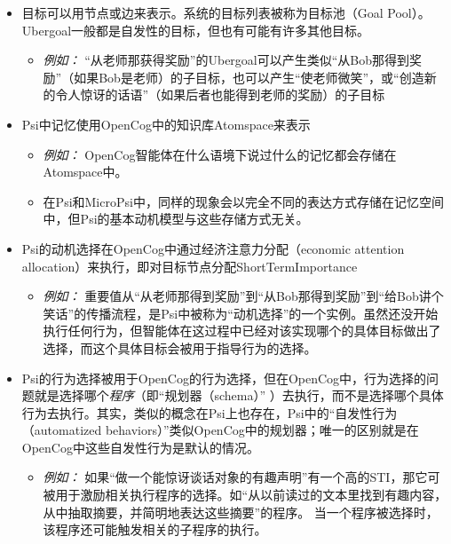 \begin{itemize}
\begin{itemize}
\end{itemize}

\item 目标可以用节点或边来表示。系统的目标列表被称为目标池（Goal Pool）。Ubergoal一般都是自发性的目标，但也有可能有许多其他目标。

\begin{itemize}
\item {\it 例如：} “从老师那获得奖励”的Ubergoal可以产生类似“从Bob那得到奖励”（如果Bob是老师）的子目标，也可以产生“使老师微笑”，或“创造新的令人惊讶的话语”（如果后者也能得到老师的奖励）的子目标
\end{itemize}

\item Psi中记忆使用OpenCog中的知识库Atomspace来表示
\begin{itemize}
\item {\it 例如：} OpenCog智能体在什么语境下说过什么的记忆都会存储在Atomspace中。

\item 在Psi和MicroPsi中，同样的现象会以完全不同的表达方式存储在记忆空间中，但Psi的基本动机模型与这些存储方式无关。

\end{itemize}

\item Psi的动机选择在OpenCog中通过经济注意力分配（economic attention allocation）来执行，即对目标节点分配ShortTermImportance  

\begin{itemize}
\item {\it 例如：} 重要值从“从老师那得到奖励”到“从Bob那得到奖励”到“给Bob讲个笑话”的传播流程，是Psi中被称为“动机选择”的一个实例。虽然还没开始执行任何行为，但智能体在这过程中已经对该实现哪个的具体目标做出了选择，而这个具体目标会被用于指导行为的选择。
\end{itemize} 

\item Psi的行为选择被用于OpenCog的行为选择，但在OpenCog中，行为选择的问题就是选择哪个{\it 程序}（即“规划器（schema）” ）去执行，而不是选择哪个具体行为去执行。其实，类似的概念在Psi上也存在，Psi中的“自发性行为（automatized behaviors）”类似OpenCog中的规划器；唯一的区别就是在OpenCog中这些自发性行为是默认的情况。

\begin{itemize}
\item {\it 例如：} 如果“做一个能惊讶谈话对象的有趣声明”有一个高的STI，那它可被用于激励相关执行程序的选择。如“从以前读过的文本里找到有趣内容，从中抽取摘要，并简明地表达这些摘要”的程序。 当一个程序被选择时，该程序还可能触发相关的子程序的执行。
\end{itemize}


\end{itemize}
